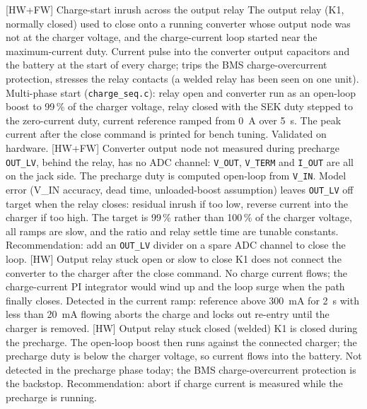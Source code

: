 \begin{FMEATable}
    \FMEAItemModerate
        {[HW+FW] Charge-start inrush across the output relay}
        {The output relay (K1, normally closed) used to close onto a running converter whose output node was not at the charger voltage, and the charge-current loop started near the maximum-current duty.}
        {Current pulse into the converter output capacitors and the battery at the start of every charge; trips the \ac{BMS} charge-overcurrent protection, stresses the relay contacts (a welded relay has been seen on one unit).}
        {Multi-phase start (\texttt{charge\_seq.c}): relay open and converter run as an open-loop boost to 99\,\% of the charger voltage, relay closed with the SEK duty stepped to the zero-current duty, current reference ramped from \qty{0}{\ampere} over \qty{5}{\second}. The peak current after the close command is printed for bench tuning. Validated on hardware.}
    \FMEAItemModerate
        {[HW+FW] Converter output node not measured during precharge}
        {\texttt{OUT\_LV}, behind the relay, has no \ac{ADC} channel: \texttt{V\_OUT}, \texttt{V\_TERM} and \texttt{I\_OUT} are all on the jack side. The precharge duty is computed open-loop from \texttt{V\_IN}.}
        {Model error (V\_IN accuracy, dead time, unloaded-boost assumption) leaves \texttt{OUT\_LV} off target when the relay closes: residual inrush if too low, reverse current into the charger if too high.}
        {The target is 99\,\% rather than 100\,\% of the charger voltage, all ramps are slow, and the ratio and relay settle time are tunable constants. Recommendation: add an \texttt{OUT\_LV} divider on a spare \ac{ADC} channel to close the loop.}
    \FMEAItemModerate
        {[HW] Output relay stuck open or slow to close}
        {K1 does not connect the converter to the charger after the close command.}
        {No charge current flows; the charge-current PI integrator would wind up and the loop surge when the path finally closes.}
        {Detected in the current ramp: reference above \qty{300}{\milli\ampere} for \qty{2}{\second} with less than \qty{20}{\milli\ampere} flowing aborts the charge and locks out re-entry until the charger is removed.}
    \FMEAItemModerate
        {[HW] Output relay stuck closed (welded)}
        {K1 is closed during the precharge.}
        {The open-loop boost then runs against the connected charger; the precharge duty is below the charger voltage, so current flows into the battery.}
        {Not detected in the precharge phase today; the \ac{BMS} charge-overcurrent protection is the backstop. Recommendation: abort if charge current is measured while the precharge is running.}

\end{FMEATable}
